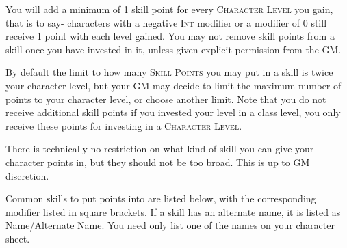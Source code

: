 You will add a minimum of 1 skill point for every \textsc{Character Level} you gain, that is to say- characters with a negative \textsc{Int} modifier or a modifier of 0 still receive 1 point with each level gained. You may not remove skill points from a skill once you have invested in it, unless given explicit permission from the GM.

By default the limit to how many \textsc{Skill Points} you may put in a skill is twice your character level, but your GM may decide to limit the maximum number of points to your character level, or choose another limit. Note that you do not receive additional skill points if you invested your level in a class level, you only receive these points for investing in a \textsc{Character Level}.

There is technically no restriction on what kind of skill you can give your character points in, but they should not be too broad. This is up to GM discretion.

Common skills to put points into are listed below, with the corresponding modifier listed in square brackets. If a skill has an alternate name, it is listed as Name/Alternate Name. You need only list one of the names on your character sheet.

